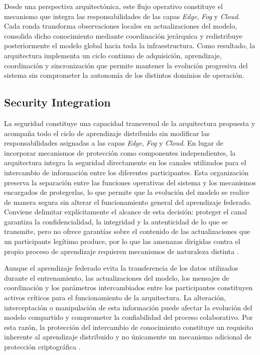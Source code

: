 \documentclass[journal,article,submit,moreauthors]{Definitions/mdpi}
\begin{document}
Desde una perspectiva arquitectónica, este flujo operativo constituye el mecanismo que integra las responsabilidades de las capas \textit{Edge}, \textit{Fog} y \textit{Cloud}. Cada ronda transforma observaciones locales en actualizaciones del modelo, consolida dicho conocimiento mediante coordinación jerárquica y redistribuye posteriormente el modelo global hacia toda la infraestructura. Como resultado, la arquitectura implementa un ciclo continuo de adquisición, aprendizaje, coordinación y sincronización que permite mantener la evolución progresiva del sistema sin comprometer la autonomía de los distintos dominios de operación.

\subsection{Security Integration}
La seguridad constituye una capacidad transversal de la arquitectura propuesta y acompaña todo el ciclo de aprendizaje distribuido sin modificar las responsabilidades asignadas a las capas \textit{Edge}, \textit{Fog} y \textit{Cloud}. En lugar de incorporar mecanismos de protección como componentes independientes, la arquitectura integra la seguridad directamente en los canales utilizados para el intercambio de información entre los diferentes participantes. Esta organización preserva la separación entre las funciones operativas del sistema y los mecanismos encargados de protegerlas, lo que permite que la evolución del modelo se realice de manera segura sin alterar el funcionamiento general del aprendizaje federado. Conviene delimitar explícitamente el alcance de esta decisión: proteger el canal garantiza la confidencialidad, la integridad y la autenticidad de lo que se transmite, pero no ofrece garantías sobre el contenido de las actualizaciones que un participante legítimo produce, por lo que las amenazas dirigidas contra el propio proceso de aprendizaje requieren mecanismos de naturaleza distinta \cite{Alshammari2026,Bunko2026}.

Aunque el aprendizaje federado evita la transferencia de los datos utilizados durante el entrenamiento, las actualizaciones del modelo, los mensajes de coordinación y los parámetros intercambiados entre los participantes constituyen activos críticos para el funcionamiento de la arquitectura. La alteración, interceptación o manipulación de esta información puede afectar la evolución del modelo compartido y comprometer la confiabilidad del proceso colaborativo. Por esta razón, la protección del intercambio de conocimiento constituye un requisito inherente al aprendizaje distribuido y no únicamente un mecanismo adicional de protección criptográfica \cite{NIST800232,Kaur2025,Gusita2025}.
\end{document}
